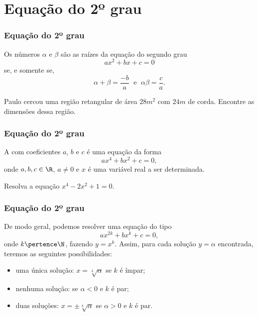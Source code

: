 \section{Equação do 2º grau}
\begin{frame}
    \frametitle{Equação do 2º grau} 
    
    \begin{teorema}
    Os números $\alpha$ e $\beta$ são as raízes da equação do segundo
    grau $$ax^2+ bx+c=0$$ se, e somente se, $$\alpha + \beta = \frac
    {-b} a \; \text{ e } \; \alpha \beta = \frac c a.$$
    \end{teorema}\pause

    \begin{exemplo}
        Paulo cercou uma região retangular de área $28m^2$ com $24m$ de corda. Encontre as dimensões dessa região.
    \end{exemplo}
    
    \end{frame}
    
    

    \begin{frame}
        \frametitle{Equação do 2º grau} 
        
        \begin{definicao}
            A  com coeficientes $a$, $b$ e $c$ é uma equação da forma $$ax^4 + bx^2 + c = 0,$$ onde $a, b, c \in \R$, $a \neq 0$ e $x$ é uma variável real a ser determinada.
        \end{definicao}\pause

        \begin{exemplo}
        Resolva a equação $x^4 - 2x^2 +1 = 0$.
        \end{exemplo}

    \end{frame}
    
    
    
    \begin{frame}
        \frametitle{Equação do 2º grau} 

        De modo geral, podemos resolver uma equação do tipo $$ax^{2k} +bx^k +c = 0,$$ onde $k \pertence \N$, fazendo $y=x^k$. Assim, para cada solução $y = \alpha$ encontrada, teremos as seguintes possibilidades:\pause
        \begin{itemize}
            \item uma única solução: $x = \sqrt[k]\alpha $ se $k$ é ímpar;\pause
            \item nenhuma solução: se $\alpha < 0$ e $k$ é par;\pause
            \item duas soluções: $x = \pm \sqrt[k]\alpha $ se $\alpha > 0$ e $k$ é par.
        \end{itemize}
        
    
    \end{frame}
        
        
